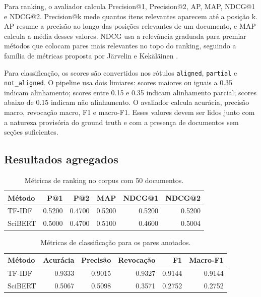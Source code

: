 \documentclass[12pt]{article}
\begin{document}
Para ranking, o avaliador calcula Precision@1, Precision@2, AP, MAP, NDCG@1 e NDCG@2. Precision@k mede quantos itens relevantes aparecem até a posição k. AP resume a precisão ao longo das posições relevantes de um documento, e MAP calcula a média desses valores. NDCG usa a relevância graduada para premiar métodos que colocam pares mais relevantes no topo do ranking, seguindo a família de métricas proposta por Järvelin e Kekäläinen \cite{jarvelin2002cumulated}.

Para classificação, os scores são convertidos nos rótulos \texttt{aligned}, \texttt{partial} e \texttt{not\_aligned}. O pipeline usa dois limiares: scores maiores ou iguais a 0.35 indicam alinhamento; scores entre 0.15 e 0.35 indicam alinhamento parcial; scores abaixo de 0.15 indicam não alinhamento. O avaliador calcula acurácia, precisão macro, revocação macro, F1 e macro-F1. Esses valores devem ser lidos junto com a natureza provisória do ground truth e com a presença de documentos sem seções suficientes.

\subsection{Resultados agregados}

\begin{table}[h]
    \centering
    \begin{tabular}{lrrrrr}
        \toprule
        Método & P@1 & P@2 & MAP & NDCG@1 & NDCG@2 \\
        \midrule
        TF-IDF & 0.5200 & 0.4700 & 0.5200 & 0.5200 & 0.5200 \\
        SciBERT & 0.5000 & 0.4700 & 0.5100 & 0.4600 & 0.5004 \\
        \bottomrule
    \end{tabular}
    \caption{Métricas de ranking no corpus com 50 documentos.}
    \label{tab:ranking}
\end{table}

\begin{table}[h]
    \centering
    \begin{tabular}{lrrrrr}
        \toprule
        Método & Acurácia & Precisão & Revocação & F1 & Macro-F1 \\
        \midrule
        TF-IDF & 0.9333 & 0.9015 & 0.9327 & 0.9144 & 0.9144 \\
        SciBERT & 0.5067 & 0.5098 & 0.3571 & 0.2752 & 0.2752 \\
        \bottomrule
    \end{tabular}
    \caption{Métricas de classificação para os pares anotados.}
    \label{tab:classificacao}
\end{table}
\end{document}
